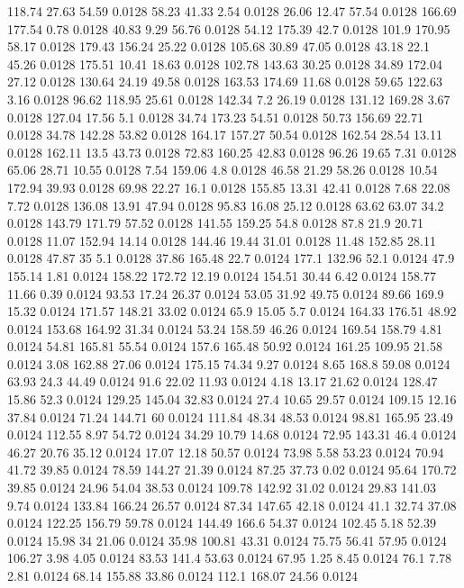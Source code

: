 118.74	27.63	54.59	0.0128
58.23	41.33	2.54	0.0128
26.06	12.47	57.54	0.0128
166.69	177.54	0.78	0.0128
40.83	9.29	56.76	0.0128
54.12	175.39	42.7	0.0128
101.9	170.95	58.17	0.0128
179.43	156.24	25.22	0.0128
105.68	30.89	47.05	0.0128
43.18	22.1	45.26	0.0128
175.51	10.41	18.63	0.0128
102.78	143.63	30.25	0.0128
34.89	172.04	27.12	0.0128
130.64	24.19	49.58	0.0128
163.53	174.69	11.68	0.0128
59.65	122.63	3.16	0.0128
96.62	118.95	25.61	0.0128
142.34	7.2	26.19	0.0128
131.12	169.28	3.67	0.0128
127.04	17.56	5.1	0.0128
34.74	173.23	54.51	0.0128
50.73	156.69	22.71	0.0128
34.78	142.28	53.82	0.0128
164.17	157.27	50.54	0.0128
162.54	28.54	13.11	0.0128
162.11	13.5	43.73	0.0128
72.83	160.25	42.83	0.0128
96.26	19.65	7.31	0.0128
65.06	28.71	10.55	0.0128
7.54	159.06	4.8	0.0128
46.58	21.29	58.26	0.0128
10.54	172.94	39.93	0.0128
69.98	22.27	16.1	0.0128
155.85	13.31	42.41	0.0128
7.68	22.08	7.72	0.0128
136.08	13.91	47.94	0.0128
95.83	16.08	25.12	0.0128
63.62	63.07	34.2	0.0128
143.79	171.79	57.52	0.0128
141.55	159.25	54.8	0.0128
87.8	21.9	20.71	0.0128
11.07	152.94	14.14	0.0128
144.46	19.44	31.01	0.0128
11.48	152.85	28.11	0.0128
47.87	35	5.1	0.0128
37.86	165.48	22.7	0.0124
177.1	132.96	52.1	0.0124
47.9	155.14	1.81	0.0124
158.22	172.72	12.19	0.0124
154.51	30.44	6.42	0.0124
158.77	11.66	0.39	0.0124
93.53	17.24	26.37	0.0124
53.05	31.92	49.75	0.0124
89.66	169.9	15.32	0.0124
171.57	148.21	33.02	0.0124
65.9	15.05	5.7	0.0124
164.33	176.51	48.92	0.0124
153.68	164.92	31.34	0.0124
53.24	158.59	46.26	0.0124
169.54	158.79	4.81	0.0124
54.81	165.81	55.54	0.0124
157.6	165.48	50.92	0.0124
161.25	109.95	21.58	0.0124
3.08	162.88	27.06	0.0124
175.15	74.34	9.27	0.0124
8.65	168.8	59.08	0.0124
63.93	24.3	44.49	0.0124
91.6	22.02	11.93	0.0124
4.18	13.17	21.62	0.0124
128.47	15.86	52.3	0.0124
129.25	145.04	32.83	0.0124
27.4	10.65	29.57	0.0124
109.15	12.16	37.84	0.0124
71.24	144.71	60	0.0124
111.84	48.34	48.53	0.0124
98.81	165.95	23.49	0.0124
112.55	8.97	54.72	0.0124
34.29	10.79	14.68	0.0124
72.95	143.31	46.4	0.0124
46.27	20.76	35.12	0.0124
17.07	12.18	50.57	0.0124
73.98	5.58	53.23	0.0124
70.94	41.72	39.85	0.0124
78.59	144.27	21.39	0.0124
87.25	37.73	0.02	0.0124
95.64	170.72	39.85	0.0124
24.96	54.04	38.53	0.0124
109.78	142.92	31.02	0.0124
29.83	141.03	9.74	0.0124
133.84	166.24	26.57	0.0124
87.34	147.65	42.18	0.0124
41.1	32.74	37.08	0.0124
122.25	156.79	59.78	0.0124
144.49	166.6	54.37	0.0124
102.45	5.18	52.39	0.0124
15.98	34	21.06	0.0124
35.98	100.81	43.31	0.0124
75.75	56.41	57.95	0.0124
106.27	3.98	4.05	0.0124
83.53	141.4	53.63	0.0124
67.95	1.25	8.45	0.0124
76.1	7.78	2.81	0.0124
68.14	155.88	33.86	0.0124
112.1	168.07	24.56	0.0124
